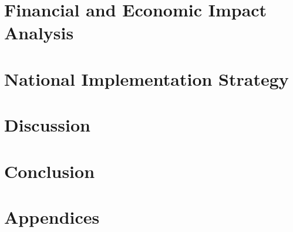 \documentclass[a4paper,12pt,twoside]{article}
\begin{document}
\section{Financial and Economic Impact Analysis}
\label{sec:financial}

\newpage

\section{National Implementation Strategy}
\label{sec:implementation}

\newpage

\section{Discussion}
\label{sec:discussion}

\newpage

\section{Conclusion}
\label{sec:conclusion}

\newpage

\pagestyle{contents}

\begingroup
\raggedright


\endgroup
\newpage

\section*{Appendices}

\end{document}
